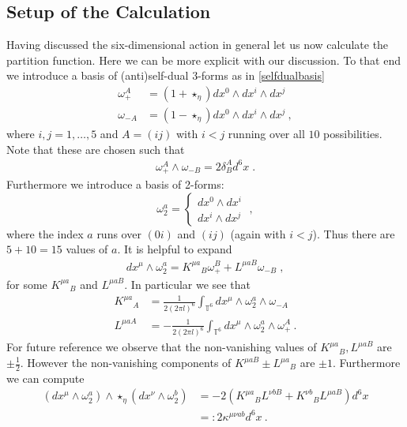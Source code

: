 \documentclass[11pt]{article}
\numberwithin{equation}{section}
\begin{document}
\subsection{Setup of the Calculation}

Having discussed the six-dimensional action in general let us now calculate the partition function. Here we can be more explicit with our discussion.
To that end we introduce  a basis of (anti)self-dual 3-forms as in \eqref{selfdualbasis}
\begin{align} 
\omega^A_+ &= (1+\star_\eta)dx^0\wedge dx^i\wedge dx^j\nonumber	\\
\omega_{-A} & = (1-\star_\eta)dx^0\wedge dx^i\wedge dx^j\ ,
\end{align}
where $i,j=1,\ldots,5$ and $A=(i j)$ with $i<j$ running over all $10$ possibilities. Note that these are chosen such that
\begin{align}
\omega_+^A\wedge \omega_{-B}	 = 2\delta^A_B d^6x\;.
\end{align}
Furthermore we introduce a basis of 2-forms:
\begin{equation}
\omega_2^a  = \left\{	\begin{array}{ll}
	dx^0\wedge dx^i \\ dx^i\wedge dx^j
\end{array} \right.\;,
\end{equation}
where the index $a$ runs over $(0i)$ and $(i j)$ (again with $i<j$). Thus there are $5+10=15$ values of $a$. It is helpful to expand
\begin{align} dx^\mu \wedge \omega_2^a= K^{\mu a}{}_B \omega^B_+ + L^{\mu a B}{} \omega_{-B} \;,
\end{align}
for some $K^{\mu a}{}_B $ and  $L^{\mu a B}{}$.
In particular we see that
\begin{align}
K^{\mu a}{}_A & = \frac{1}{2(2\pi l)^6}\int_{\mathbb{T}^{6}}  dx^\mu \wedge \omega^a_2\wedge \omega_{-A}	\nonumber\\
 L^{\mu a A} & = -\frac{1}{2(2\pi l)^6}\int_{\mathbb{T}^{6}}  dx^\mu \wedge \omega^a_2\wedge \omega_+^{A}\ .
 \end{align}
For future reference we observe that the non-vanishing values of $K^{\mu a }{}_B,L^{\mu a B}$ are $\pm \frac12$. However the non-vanishing components of $K^{\mu  a B}\pm L^{\mu a}{}_B$ are $\pm1$.
 Furthermore we can compute
\begin{align}
( dx^\mu \wedge \omega^a_2)\wedge \star_\eta(	dx^\nu \wedge \omega^b_2) &=-2( K^{\mu a}{}_BL^{\nu b B}{} +K^{\nu b}{}_BL^{\mu a B}{})d^6x\nonumber\\
&=: 2\kappa^{\mu\nu ab} d^6x\ .
\end{align}
\end{document}
